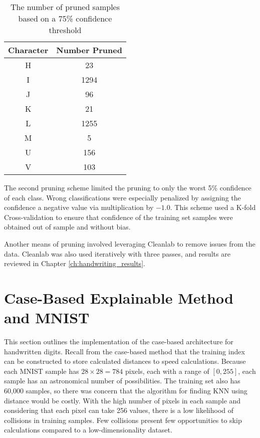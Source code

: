 \begin{table}
    \renewcommand{\arraystretch}{1.3}
    \caption{The number of pruned samples based on a 75\% confidence threshold}
    \begin{center}
    \begin{tabular}{|c|c|}
        \hline
        Character & Number Pruned \\
        \hline
        \hline
        H & 23 \\   \hline
        I & 1294 \\ \hline
        J & 96 \\   \hline
        K & 21 \\   \hline
        L & 1255 \\ \hline
        M & 5 \\    \hline
        U & 156 \\  \hline
        V & 103 \\
        \hline
    \end{tabular}
\end{center}
    \label{tab:threshold_pruning_qty}
\end{table}

The second pruning scheme limited the pruning to only the worst 5\% confidence
of each class. Wrong classifications were especially penalized by assigning the
confidence a negative value via multiplication by $-1.0$. This scheme used a
K-fold Cross-validation to ensure that confidence of the training set samples
were obtained out of sample and without bias.

Another means of pruning involved leveraging Cleanlab to remove issues from the
data. Cleanlab was also used iteratively with three passes, and results are
reviewed in Chapter \ref{ch:handwriting_results}.

\section{Case-Based Explainable Method and MNIST}

This section outlines the implementation of the case-based architecture for
handwritten digits. Recall from the case-based method that the training index
can be constructed to store calculated distances to speed calculations. Because
each MNIST sample has $28\times28=784$ pixels, each with a range of $[0, 255]$,
each sample has an astronomical number of possibilities. The training set also
has 60,000 samples, so there was concern that the algorithm for finding KNN
using distance would be costly. With the high number of pixels in each sample
and considering that each pixel can take 256 values, there is a low likelihood
of collisions in training samples. Few collisions present few opportunities to
skip calculations compared to a low-dimensionality dataset.

